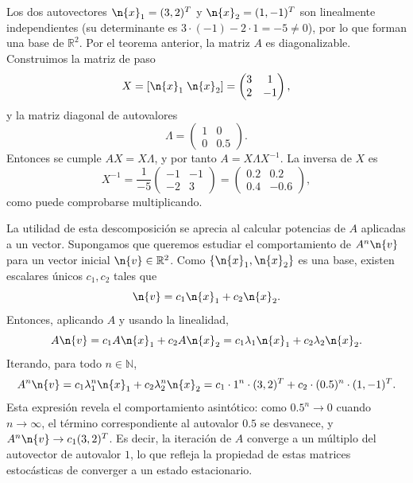 Los dos autovectores \(\n{x}_1 = (3,2)^T\) y \(\n{x}_2 = (1,-1)^T\) son linealmente independientes (su determinante es \(3\cdot(-1) - 2\cdot 1 = -5 \neq 0\)), por lo que forman una base de \(\mathbb{R}^2\). Por el teorema anterior, la matriz \(A\) es diagonalizable. Construimos la matriz de paso
\[
X = [\n{x}_1 \; \n{x}_2] = \begin{pmatrix} 3 & 1 \\ 2 & -1 \end{pmatrix},
\]
y la matriz diagonal de autovalores
\[
\Lambda = \begin{pmatrix} 1 & 0 \\ 0 & 0.5 \end{pmatrix}.
\]
Entonces se cumple \(A X = X \Lambda\), y por tanto \(A = X \Lambda X^{-1}\). La inversa de \(X\) es
\[
X^{-1} = \frac{1}{-5} \begin{pmatrix} -1 & -1 \\ -2 & 3 \end{pmatrix} = \begin{pmatrix} 0.2 & 0.2 \\ 0.4 & -0.6 \end{pmatrix},
\]
como puede comprobarse multiplicando.

La utilidad de esta descomposición se aprecia al calcular potencias de \(A\) aplicadas a un vector. Supongamos que queremos estudiar el comportamiento de \(A^n \n{v}\) para un vector inicial \(\n{v} \in \mathbb{R}^2\). Como \(\{\n{x}_1, \n{x}_2\}\) es una base, existen escalares únicos \(c_1, c_2\) tales que
\[
\n{v} = c_1 \n{x}_1 + c_2 \n{x}_2.
\]
Entonces, aplicando \(A\) y usando la linealidad,
\[
A\n{v} = c_1 A\n{x}_1 + c_2 A\n{x}_2 = c_1 \lambda_1 \n{x}_1 + c_2 \lambda_2 \n{x}_2.
\]
Iterando, para todo \(n \in \mathbb{N}\),
\[
A^n \n{v} = c_1 \lambda_1^n \n{x}_1 + c_2 \lambda_2^n \n{x}_2 = c_1 \cdot 1^n \cdot (3,2)^T + c_2 \cdot (0.5)^n \cdot (1,-1)^T.
\]
Esta expresión revela el comportamiento asintótico: como \(0.5^n \to 0\) cuando \(n\to\infty\), el término correspondiente al autovalor \(0.5\) se desvanece, y \(A^n \n{v} \to c_1 (3,2)^T\). Es decir, la iteración de \(A\) converge a un múltiplo del autovector de autovalor \(1\), lo que refleja la propiedad de estas matrices estocásticas de converger a un estado estacionario.

